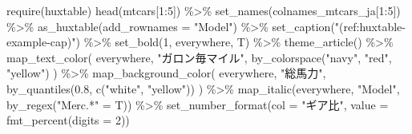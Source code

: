 \documentclass[
]{bxjsbook}
\newenvironment{Shaded}{\begin{snugshade}}{\end{snugshade}}
\newcommand{\AttributeTok}[1]{\textcolor[rgb]{0.77,0.63,0.00}{#1}}
\newcommand{\DecValTok}[1]{\textcolor[rgb]{0.00,0.00,0.81}{#1}}
\newcommand{\FloatTok}[1]{\textcolor[rgb]{0.00,0.00,0.81}{#1}}
\newcommand{\FunctionTok}[1]{\textcolor[rgb]{0.00,0.00,0.00}{#1}}
\newcommand{\NormalTok}[1]{#1}
\newcommand{\OtherTok}[1]{\textcolor[rgb]{0.56,0.35,0.01}{#1}}
\newcommand{\SpecialCharTok}[1]{\textcolor[rgb]{0.00,0.00,0.00}{#1}}
\newcommand{\StringTok}[1]{\textcolor[rgb]{0.31,0.60,0.02}{#1}}
\theoremstyle{definition}
\theoremstyle{definition}
\theoremstyle{definition}
\theoremstyle{remark}
\begin{document}
\begin{Shaded}
\begin{Highlighting}[numbers=left,,]
\FunctionTok{require}\NormalTok{(huxtable)}
\FunctionTok{head}\NormalTok{(mtcars[}\DecValTok{1}\SpecialCharTok{:}\DecValTok{5}\NormalTok{]) }\SpecialCharTok{\%\textgreater{}\%}
  \FunctionTok{set\_names}\NormalTok{(colnames\_mtcars\_ja[}\DecValTok{1}\SpecialCharTok{:}\DecValTok{5}\NormalTok{]) }\SpecialCharTok{\%\textgreater{}\%}
  \FunctionTok{as\_huxtable}\NormalTok{(}\AttributeTok{add\_rownames =} \StringTok{"Model"}\NormalTok{) }\SpecialCharTok{\%\textgreater{}\%}
  \FunctionTok{set\_caption}\NormalTok{(}\StringTok{"(ref:huxtable{-}example{-}cap)"}\NormalTok{) }\SpecialCharTok{\%\textgreater{}\%}
  \FunctionTok{set\_bold}\NormalTok{(}\DecValTok{1}\NormalTok{, everywhere, T) }\SpecialCharTok{\%\textgreater{}\%}
  \FunctionTok{theme\_article}\NormalTok{() }\SpecialCharTok{\%\textgreater{}\%}
  \FunctionTok{map\_text\_color}\NormalTok{(}
\NormalTok{    everywhere, }\StringTok{"ガロン毎マイル"}\NormalTok{, }\FunctionTok{by\_colorspace}\NormalTok{(}\StringTok{"navy"}\NormalTok{, }\StringTok{"red"}\NormalTok{, }\StringTok{"yellow"}\NormalTok{)}
\NormalTok{  ) }\SpecialCharTok{\%\textgreater{}\%}
  \FunctionTok{map\_background\_color}\NormalTok{(}
\NormalTok{    everywhere, }\StringTok{"総馬力"}\NormalTok{, }\FunctionTok{by\_quantiles}\NormalTok{(}\FloatTok{0.8}\NormalTok{, }\FunctionTok{c}\NormalTok{(}\StringTok{"white"}\NormalTok{, }\StringTok{"yellow"}\NormalTok{))}
\NormalTok{  ) }\SpecialCharTok{\%\textgreater{}\%}
  \FunctionTok{map\_italic}\NormalTok{(everywhere, }\StringTok{"Model"}\NormalTok{, }\FunctionTok{by\_regex}\NormalTok{(}\StringTok{"Merc.*"} \OtherTok{=}\NormalTok{ T)) }\SpecialCharTok{\%\textgreater{}\%}
  \FunctionTok{set\_number\_format}\NormalTok{(}\AttributeTok{col =} \StringTok{"ギア比"}\NormalTok{, }\AttributeTok{value =} \FunctionTok{fmt\_percent}\NormalTok{(}\AttributeTok{digits =} \DecValTok{2}\NormalTok{))}
\end{Highlighting}
\end{Shaded}

 
  \providecommand{\huxb}[2]{\arrayrulecolor[RGB]{#1}\global\arrayrulewidth=#2pt}
  \providecommand{\huxvb}[2]{\color[RGB]{#1}\vrule width #2pt}
  \providecommand{\huxtpad}[1]{\rule{0pt}{#1}}
  \providecommand{\huxbpad}[1]{\rule[-#1]{0pt}{#1}}
\end{document}

